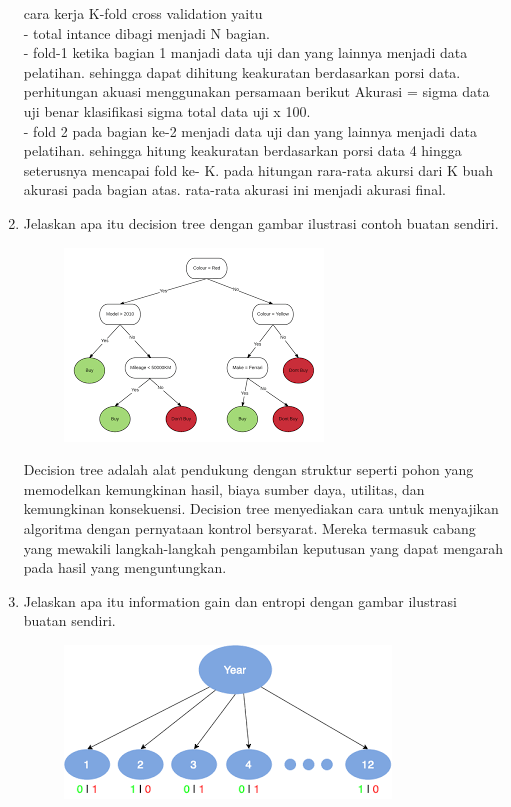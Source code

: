 \begin{enumerate}
cara kerja K-fold cross validation yaitu \\
- total intance dibagi menjadi N bagian.\\
- fold-1 ketika bagian 1 manjadi data uji dan yang lainnya menjadi data pelatihan. sehingga dapat dihitung keakuratan berdasarkan porsi data. perhitungan akuasi menggunakan persamaan berikut Akurasi = sigma data uji benar klasifikasi sigma total data uji x 100.\\
- fold 2 pada bagian ke-2 menjadi data uji dan yang lainnya menjadi data pelatihan. sehingga hitung keakuratan berdasarkan porsi data 4 hingga seterusnya mencapai fold ke- K. pada hitungan rara-rata akursi dari K buah akurasi pada bagian atas. rata-rata akurasi ini menjadi akurasi final.
\item
Jelaskan apa itu decision tree dengan gambar ilustrasi contoh buatan sendiri.
\begin{figure}[!htbp]
		\centering
		\includegraphics[scale=0.4]{figures/chapter2/decision.png}
    \end{figure}
    \newpage
Decision tree adalah alat pendukung dengan struktur seperti pohon yang memodelkan kemungkinan hasil, biaya sumber daya, utilitas, dan kemungkinan konsekuensi. Decision tree menyediakan cara untuk menyajikan algoritma dengan pernyataan kontrol bersyarat. Mereka termasuk cabang yang mewakili langkah-langkah pengambilan keputusan yang dapat mengarah pada hasil yang menguntungkan.
\item
Jelaskan apa itu information gain dan entropi dengan gambar ilustrasi buatan sendiri.
\begin{figure}[!htbp]
		\centering
		\includegraphics[scale=0.4]{figures/chapter2/informasigain.png}

\end{figure}
\end{enumerate}
